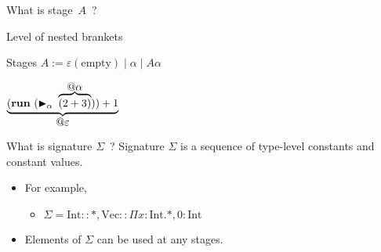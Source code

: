 \documentclass[dvipdfmx,aspectratio=169, 20pt]{beamer}
\begin{document}
\begin{frame}[fragile]{What is stage\ \( A \)\ ?}
    \newcommand{\underwrite}[3][]{
        \genfrac{}{}{#1}{}{\textstyle #2}{\textstyle #3}
    }

    Level of nested brankets
    \begin{block}{Stages}
        \( A := \varepsilon (\text{empty}) \mid \alpha \mid A\alpha \)
    \end{block}
    \begin{center}
        \( \underbrace{(\textbf{run}\ (\TB_\alpha\ \overbrace{(2 + 3)}^{\let\scriptstyle\textstyle\substack{@\alpha}})) + 1}_{\let\scriptstyle\textstyle\substack{@\varepsilon}} \)
    \end{center}
\end{frame}

\begin{frame}[fragile]{What is signature \( \Sigma \)\ ?}
    Signature \( \Sigma \) is a sequence of type-level constants and constant values.
    \begin{itemize}
        \item For example,
            \begin{itemize}
                \item \( \Sigma = \text{Int}::*, \text{Vec}::\Pi x:\text{Int}.*, 0:\text{Int} \)
            \end{itemize}
        \item Elements of \( \Sigma \) can be used at any stages.
    \end{itemize}
\end{frame}
\end{document}
